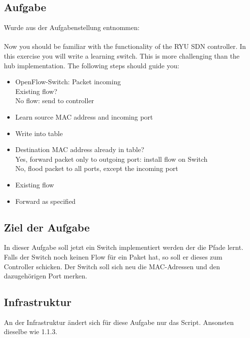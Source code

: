 \documentclass[a4,12pt]{scrartcl}
\begin{document}
\subsection{Aufgabe}
Wurde aus der Aufgabenstellung entnommen: \\
\\
Now you should be familiar with the functionality of the RYU SDN controller. In this exercise you will write a learning switch. This is more challenging than the hub implementation. The following steps should guide you:
\begin{itemize}
\item OpenFlow-Switch: Packet incoming\\
Existing flow?\\
No flow: send to controller
\item Learn source MAC address and incoming port
\item Write into table
\item  Destination MAC address already in table?\\
Yes, forward packet only to outgoing port: install flow on Switch\\
No, flood packet to all ports, except the incoming port
\item Existing flow
\item Forward as specified
\end{itemize}

\subsection{Ziel der Aufgabe}
In dieser Aufgabe soll jetzt ein Switch implementiert werden der die Pfade lernt. Falls der Switch noch keinen Flow für ein Paket hat, so soll er dieses zum Controller schicken. Der Switch soll sich neu die MAC-Adressen und den dazugehörigen Port merken. 

\subsection{Infrastruktur}
An der Infrastruktur ändert sich für diese Aufgabe nur das Script. Ansonsten dieselbe wie 1.1.3.
\newpage
\end{document}
